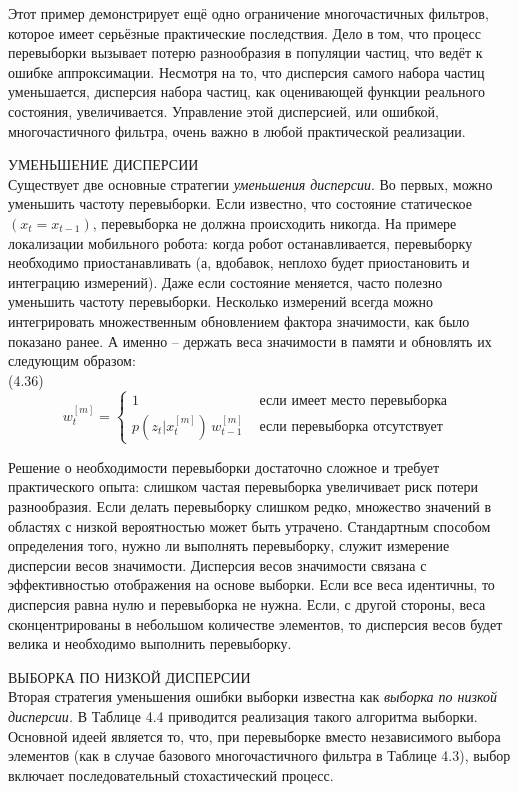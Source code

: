 \documentclass[10pt,a4paper]{article}
\begin{document}
Этот пример демонстрирует ещё одно ограничение многочастичных фильтров, которое имеет серьёзные практические последствия. Дело в том, что процесс перевыборки вызывает потерю разнообразия в популяции частиц, что ведёт к ошибке аппроксимации. Несмотря на то, что дисперсия самого набора частиц уменьшается, дисперсия набора частиц, как оценивающей функции реального состояния, увеличивается. Управление этой дисперсией, или ошибкой, многочастичного фильтра, очень важно в любой практической реализации. 

УМЕНЬШЕНИЕ ДИСПЕРСИИ \\
Существует две основные стратегии \textit{уменьшения дисперсии}. Во первых, можно уменьшить частоту перевыборки. Если известно, что состояние статическое $(x_t = x_{t-1})$, перевыборка не должна происходить никогда. На примере локализации мобильного робота: когда робот останавливается, перевыборку необходимо приостанавливать (а, вдобавок, неплохо будет приостановить и интеграцию измерений). Даже если состояние меняется, часто полезно уменьшить частоту перевыборки. Несколько измерений всегда можно интегрировать множественным обновлением фактора значимости, как было показано ранее. А именно – держать веса значимости в памяти и обновлять их следующим образом:\\

(4.36)
\begin{equation*}
w_t^{[m]}=\left\{
\begin{array}{ll}
1 & \mbox{ если имеет место перевыборка }\\
p(z_t|x_t^{[m]})\,w_{t-1}^{[m]}& \mbox{ если перевыборка отсутствует }
\end{array}
\right.
\end{equation*}

Решение о необходимости перевыборки достаточно сложное и требует практического опыта:
слишком частая перевыборка увеличивает риск потери разнообразия. Если делать перевыборку слишком редко, множество значений в областях с низкой вероятностью может быть утрачено. Стандартным способом определения того, нужно ли выполнять перевыборку, служит измерение дисперсии весов значимости. Дисперсия весов значимости связана с эффективностью отображения на основе выборки. Если все веса идентичны, то дисперсия равна нулю и перевыборка не нужна. Если, с другой стороны, веса сконцентрированы в небольшом количестве элементов, то дисперсия весов будет велика и необходимо выполнить перевыборку.
 
ВЫБОРКА ПО НИЗКОЙ ДИСПЕРСИИ\\
Вторая стратегия уменьшения ошибки выборки известна как \textit{выборка по низкой дисперсии.} В Таблице 4.4 приводится реализация такого алгоритма выборки. Основной идеей является то, что, при перевыборке вместо независимого выбора элементов (как в случае базового многочастичного фильтра в Таблице 4.3), выбор включает последовательный стохастический процесс.
\end{document}
